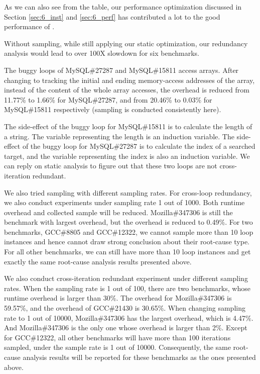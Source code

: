 As we can also see from the table, our performance optimization discussed in 
Section \ref{sec:6_inst} and \ref{sec:6_perf} has contributed
a lot to the good performance of \Tool.

Without sampling, while still applying our static optimization, our redundancy
analysis would lead to over 100X slowdown for six benchmarks.

The buggy loops of MySQL\#27287 and MySQL\#15811 access arrays. 
After changing to tracking the initial and ending memory-access addresses
of the array, instead of the content of the whole array accesses,
the overhead is reduced from 11.77\% to 1.66\% for MySQL\#27287, 
and from 20.46\% to 0.03\% for MySQL\#15811 respectively 
(sampling is conducted consistently here). 

The side-effect of the buggy loop for MySQL\#15811 is to calculate the length of a string. 
The variable representing the length is an induction variable. 
The side-effect of the buggy loop for MySQL\#27287 is to calculate the index of a searched target, 
and the variable representing the index is also an induction variable. 
We can reply on static analysis to figure out that these two loops are not cross-iteration redundant.

We also tried sampling with different sampling rates.
For cross-loop redundancy, we also conduct experiments under sampling rate 1
out of 1000. 
Both runtime overhead and collected sample will be reduced. Mozilla\#347306 
is still the benchmark with largest overhead, but the overhead is reduced to 0.49\%. 
For two benchmarks, GCC\#8805 and GCC\#12322, we cannot sample 
more than 10 loop instances and hence cannot draw strong conclusion
about their root-cause type. For all other benchmarks, we can 
still have more than 10 loop instances and get exactly the same 
root-cause analysis results presented above.

We also conduct cross-iteration redundant experiment under different sampling rates. 
When the sampling rate is 1 out of 100, there are two benchmarks, whose runtime overhead is larger than 30\%. The overhead for Mozilla\#347306 is 59.57\%, 
and the overhead of GCC\#21430 is 30.65\%. When changing sampling rate to 1
out of 10000, Mozilla\#347306 has the largest overhead, which is 4.47\%. And Mozilla\#347306 is the only one whose overhead is larger than 2\%. Except for 
GCC\#12322, all other benchmarks will have more than 100 iterations sampled, under the sample rate is 1 out of 10000. Consequently, the same root-cause
analysis results will be reported for these benchmarks as the ones presented
above.
